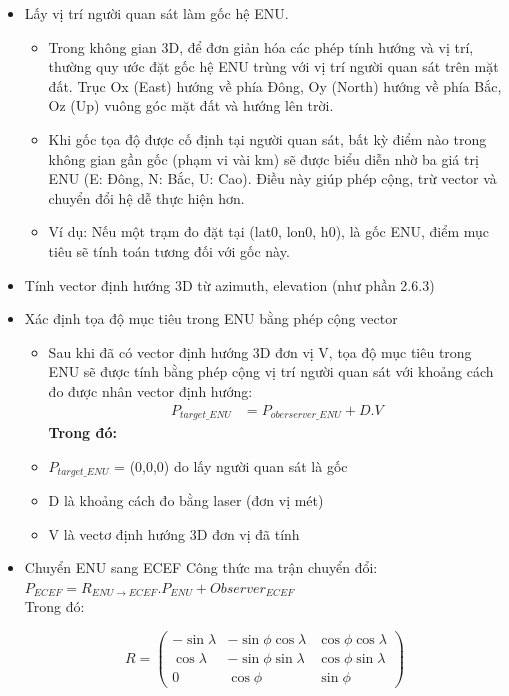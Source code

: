 \begin{itemize}
    \item Lấy vị trí người quan sát làm gốc hệ ENU.
    \begin{itemize}
        \item Trong không gian 3D, để đơn giản hóa các phép tính hướng và vị trí, thường quy ước đặt gốc hệ ENU trùng với vị trí người quan sát trên mặt đất. Trục Ox (East) hướng về phía Đông, Oy (North) hướng về phía Bắc, Oz (Up) vuông góc mặt đất và hướng lên trời.
        \item Khi gốc tọa độ được cố định tại người quan sát, bất kỳ điểm nào trong không gian gần gốc (phạm vi vài km) sẽ được biểu diễn nhờ ba giá trị ENU (E: Đông, N: Bắc, U: Cao). Điều này giúp phép cộng, trừ vector và chuyển đổi hệ dễ thực hiện hơn.
        \item Ví dụ: Nếu một trạm đo đặt tại (lat0, lon0, h0), là gốc ENU, điểm mục tiêu sẽ tính toán tương đối với gốc này.
    \end{itemize}
    \item Tính vector định hướng 3D từ azimuth, elevation (như phần 2.6.3)
    \item Xác định tọa độ mục tiêu trong ENU bằng phép cộng vector
    \begin{itemize}
        \item Sau khi đã có vector định hướng 3D đơn vị V, tọa độ mục tiêu trong ENU sẽ được tính bằng phép cộng vị trí người quan sát với khoảng cách đo được nhân vector định hướng:
$$
\begin{aligned}
P_{target\_ENU} &= P_{oberserver\_ENU} + D.V
\end{aligned}
$$
\textbf{Trong đó:}
    \item $P_{target\_ENU}$ = (0,0,0) do lấy người quan sát là gốc
    \item D là khoảng cách đo bằng laser (đơn vị mét)
    \item V là vectơ định hướng 3D đơn vị đã tính
    \end{itemize}
    \item Chuyển ENU sang ECEF
    Công thức ma trận chuyển đổi: $P_{ECEF} = R_{ENU \rightarrow ECEF} . P_{ENU} + Observer_{ECEF}$ \\
    Trong đó: 
    

\[
R = \begin{pmatrix}
-\sin\lambda & -\sin\phi\cos\lambda & \cos\phi\cos\lambda \\
\cos\lambda & -\sin\phi\sin\lambda & \cos\phi\sin\lambda \\
0 & \cos\phi & \sin\phi
\end{pmatrix}
\]


\end{itemize}
